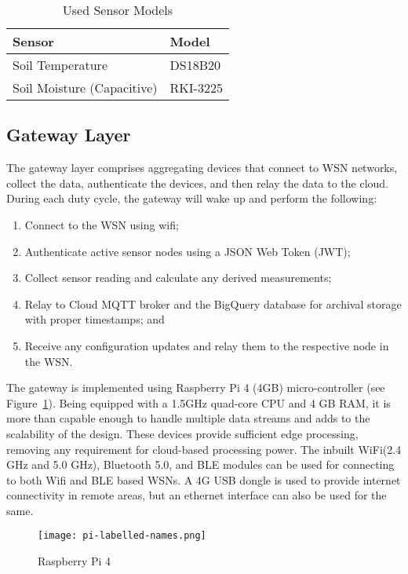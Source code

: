   \FloatBarrier
  \begin{table}[!h]
    \centering
    \begin{tabular}{ p{5cm} p{5cm}}
      \hline
      \textbf{Sensor} & \textbf{Model}\\
      \hline
      Soil Temperature & DS18B20\\
      Soil Moisture (Capacitive) & RKI-3225\\
      \hline
    \end{tabular}
    \caption{Used Sensor Models} 
    \label{table:sensors}
  \end{table}

\subsection{Gateway Layer}

  The gateway layer comprises aggregating devices that connect to WSN networks, collect the data, authenticate the devices, and then relay the data to the cloud. During each duty cycle, the gateway will wake up and perform the following:
  \begin{enumerate}
    \item Connect to the WSN using wifi;
    \item Authenticate active sensor nodes using a JSON Web Token (JWT);
    \item Collect sensor reading and calculate any derived measurements;
    \item Relay to Cloud MQTT broker and the BigQuery database for archival storage with proper timestamps; and
    \item Receive any configuration updates and relay them to the respective node in the WSN.
  \end{enumerate}
  The gateway is implemented using Raspberry Pi 4 (4GB) micro-controller (see Figure~\ref{fig:rpi}). Being equipped with a 1.5GHz quad-core CPU and 4 GB RAM, it is more than capable enough to handle multiple data streams and adds to the scalability of the design. These devices provide sufficient edge processing, removing any requirement for cloud-based processing power. The inbuilt WiFi(2.4 GHz and 5.0 GHz), Bluetooth 5.0, and BLE modules can be used for connecting to both Wifi and BLE based WSNs. A 4G USB dongle is used to provide internet connectivity in remote areas, but an ethernet interface can also be used for the same.

  \begin{figure}[!h]
    \centering
    \texttt{[image: pi-labelled-names.png]}
    \caption{Raspberry Pi 4}
    \label{fig:rpi}
  \end{figure}

